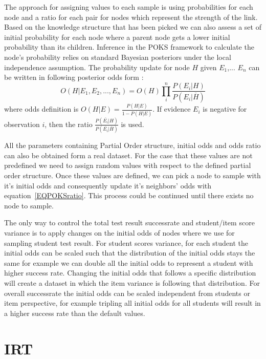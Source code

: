 The approach for assigning values to each sample is using probabilities for each node and a ratio for each pair for nodes which represent the strength of the link.  Based on the knowledge structure that has been picked we can also assess a set of initial probability for each node where a parent node gets a lower initial probability than its children. Inference in the POKS framework to calculate the node's probability relies on standard Bayesian posteriors under the local independence assumption. The probability update for node $H$ given $E_1$,... $E_n$ can be written in following posterior odds form :
\begin{equation}
O(H|E_1,E_2, ... , E_n) = O(H) \prod_{i}^{n} \frac{P(E_i|H)}{P(E_i | \overline{H})}
\label{EQPOKSratio}
\end{equation}
where odds definition is $O(H|E) = \frac{P(H|E)}{1-P(H|E)}$. If evidence $E_i$ is negative for observation $i$, then the ratio $\frac{P(\overline{E_i}|H)}{P(\overline{E_i}|\overline{H})}$ is used.

All the parameters containing Partial Order structure, initial odds and odds ratio can also be obtained form a real dataset. For the case that these values are not predefined we need to assign random values with respect to the defined partial order structure. Once these values are defined, we can pick a node to sample with it's initial odds and consequently update it's neighbors' odds with equation~\ref{EQPOKSratio}. This process could be continued until there exists no node to sample.

The only way to control the total test result successrate and student/item score variance is to apply changes on the initial odds of nodes where we use for sampling student test result. For student scores variance, for each student the initial odds can be scaled such that the distribution of the initial odds stays the same for example we can double all the initial odds to represent a student with higher success rate. Changing the initial odds that follows a specific distribution will create a dataset in which the item variance is following that distribution. For overall successrate the initial odds can be scaled independent from students or item perspective, for example tripling all initial odds for all students will result in a higher success rate than the default values.

\section{IRT}

